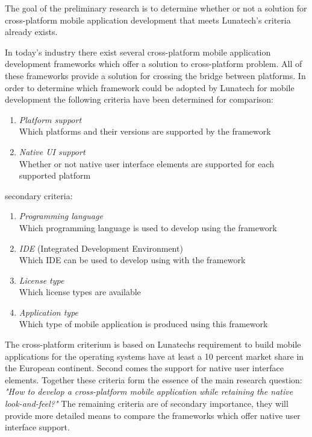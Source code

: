 
The goal of the preliminary research is to determine whether or not a solution for cross-platform mobile application development that meets Lunatech's criteria already exists.

In today's industry there exist several cross-platform mobile application development frameworks which offer a solution to cross-platform problem. All of these frameworks provide a solution for crossing the bridge between platforms. In order to determine which framework could be adopted by Lunatech for mobile development the following criteria have been determined for comparison:

\begin{enumerate}
\item \emph{Platform support}\\
Which platforms and their versions are supported by the framework
\item \emph{Native UI support}\\
Whether or not native user interface elements are supported for each supported platform
\end{enumerate}
\noindent secondary criteria:
\begin{enumerate}
\item \emph{Programming language}\\
Which programming language is used to develop using the framework
\item \emph{IDE} (Integrated Development Environment)\\
Which IDE can be used to develop using with the framework
\item \emph{License type}\\
Which license types are available
\item \emph{Application type}\\
Which type of mobile application is produced using this framework
\end{enumerate}

The cross-platform criterium is based on Lunatechs requirement to build mobile applications for the operating systems have at least a 10 percent market share in the European continent. Second comes the support for native user interface elements. Together these criteria form the essence of the main research question: \emph{"How to develop a cross-platform mobile application while retaining the native look-and-feel?"}
The remaining criteria are of secondary importance, they will provide more detailed means to compare the frameworks which offer native user interface support.

